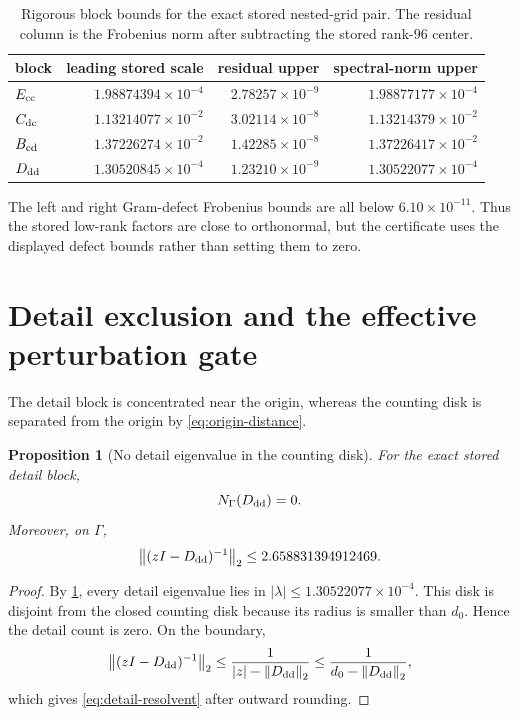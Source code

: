 \documentclass[11pt]{article}
\newtheorem{proposition}[theorem]{Proposition}
\theoremstyle{definition}
\theoremstyle{remark}
\newcommand{\Id}{I}
\newcommand{\GammaC}{\Gamma}
\newcommand{\norm}[1]{\left\lVert #1\right\rVert}
\begin{document}
\begin{table}[t]
\centering
\caption{Rigorous block bounds for the exact stored nested-grid pair.  The
residual column is the Frobenius norm after subtracting the stored rank-\(96\)
center.}
\label{tab:block-bounds}
\begin{tabular}{lrrr}
\toprule
block & leading stored scale & residual upper & spectral-norm upper\\
\midrule
\(E_{\rm cc}\) & \(1.98874394\times10^{-4}\) & \(2.78257\times10^{-9}\) & \(1.98877177\times10^{-4}\)\\
\(C_{\rm dc}\) & \(1.13214077\times10^{-2}\) & \(3.02114\times10^{-8}\) & \(1.13214379\times10^{-2}\)\\
\(B_{\rm cd}\) & \(1.37226274\times10^{-2}\) & \(1.42285\times10^{-8}\) & \(1.37226417\times10^{-2}\)\\
\(D_{\rm dd}\) & \(1.30520845\times10^{-4}\) & \(1.23210\times10^{-9}\) & \(1.30522077\times10^{-4}\)\\
\bottomrule
\end{tabular}
\end{table}

The left and right Gram-defect Frobenius bounds are all below
\(6.10\times10^{-11}\).  Thus the stored low-rank factors are close to
orthonormal, but the certificate uses the displayed defect bounds rather than
setting them to zero.

\section{Detail exclusion and the effective perturbation gate}
\label{sec:detail}

The detail block is concentrated near the origin, whereas the counting disk is
separated from the origin by \eqref{eq:origin-distance}.

\begin{proposition}[No detail eigenvalue in the counting disk]
\label{prop:detail-zero}
For the exact stored detail block,
\[
 N_{\GammaC}(D_{\rm dd})=0.
\]
Moreover, on \(\GammaC\),
\begin{equation}
 \norm{(z\Id-D_{\rm dd})^{-1}}_2
 \le 2.658831394912469.
 \label{eq:detail-resolvent}
\end{equation}
\end{proposition}

\begin{proof}
By \cref{tab:block-bounds}, every detail eigenvalue lies in
\(|\lambda|\le1.30522077\times10^{-4}\).  This disk is disjoint from the
closed counting disk because its radius is smaller than \(d_0\).  Hence the
detail count is zero.  On the boundary,
\[
 \norm{(z\Id-D_{\rm dd})^{-1}}_2
 \le\frac{1}{|z|-\norm{D_{\rm dd}}_2}
 \le\frac{1}{d_0-\norm{D_{\rm dd}}_2},
\]
which gives \eqref{eq:detail-resolvent} after outward rounding.
\end{proof}
\end{document}
